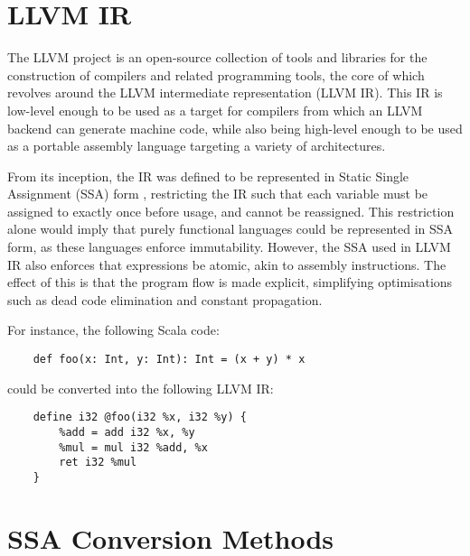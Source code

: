 
% 

\section{LLVM IR}

The LLVM project is an open-source collection of tools and libraries for the construction of
compilers and related programming tools, the core of which revolves around the LLVM intermediate
representation (LLVM IR). This IR is low-level enough to be used as a target for compilers from
which an LLVM backend can generate machine code, while also being high-level enough to be used as a
portable assembly language targeting a variety of architectures.

From its inception, the IR was defined to be represented in Static Single Assignment (SSA) form
\autocite{lattner2004llvm}, restricting the IR such that each variable must be assigned to exactly
once before usage, and cannot be reassigned. This restriction alone would imply that purely
functional languages could be represented in SSA form, as these languages enforce immutability.
However, the SSA used in LLVM IR also enforces that expressions be atomic, akin to assembly
instructions. The effect of this is that the program flow is made explicit, simplifying
optimisations such as dead code elimination and constant propagation.

For instance, the following Scala code:

\begin{verbatim}
    def foo(x: Int, y: Int): Int = (x + y) * x
\end{verbatim}

could be converted into the following LLVM IR:

\begin{verbatim}
    define i32 @foo(i32 %x, i32 %y) {
        %add = add i32 %x, %y
        %mul = mul i32 %add, %x
        ret i32 %mul
    }
\end{verbatim}

\section{SSA Conversion Methods}

